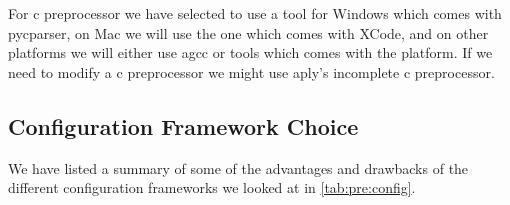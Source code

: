 For \Gls{c} \gls{preprocessor} we have selected to use a tool for Windows which comes with
\gls{pycparser}, on Mac we will use the one which comes with XCode, and on other
platforms we will either use \Gls{agcc} or tools which comes with the platform. If we
need to modify a \Gls{c} \gls{preprocessor} we might use \Gls{aply}'s incomplete \Gls{c} \gls{preprocessor}.

\subsection{Configuration Framework Choice}
\label{sec:pre:configchoice}
We have listed a summary of some of the advantages and drawbacks of the
different configuration frameworks we looked at in \autoref{tab:pre:config}.
\begin{table}[htbp] \footnotesize \center
\caption{Configuration summary\label{tab:pre:config}}
\noindent{}
\end{table}

